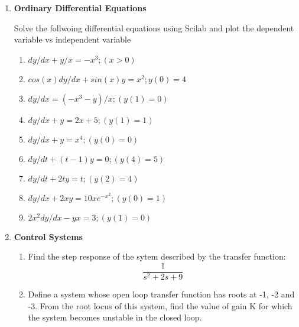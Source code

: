 \documentclass[12pt,a4paper]{article}
\newenvironment{enumcpt}{\begin{enumerate} \topsep -3mm \partopsep -3mm 
                        \parsep -3mm
                        \itemsep -0mm \leftmargin -1in \rightmargin -3mm
                        }{\end{enumerate}}
\begin{document}
\begin{multicols}{2}
\begin{enumcpt}
\begin{enumcpt}
\item Construct a polynomial with 3 repeated roots at 4 and 2 repeated
roots at 0.
Check the roots of the derivative of this polynomial. (Use derivat)

\item  Write a function that takes a polynomial and
  gives out only real roots as output.\\
  (hint isreal )

\item  Write a function that takes a polynomial and gives the
    INVERSE polynomial, i.e. all roots are inverses of each other.\\
    (Hint: Coefficients are to just be reversed.)\\
    (Check that no root was at zero: check this within the function, and
    display error, and exit.)

\item  Write a function that takes a polynomial and gives
    all the maxima/minima candidates.\\ (Hint: find all real roots of
    the derivative).

\end{enumcpt}


\item {\bf Ordinary Differential Equations}

Solve the follwoing differential equations using Scilab and plot the dependent variable vs independent variable
\begin{enumcpt}
\item  $ dy/dx + y/x = -x^3; (x>0)$
\item  $ cos(x)dy/dx + sin(x)y = x^2; y(0) = 4$
\item  $dy/dx = (-x^3-y)/x; (y(1)=0)$
\item  $dy/dx+y = 2x+5; (y(1)= 1)$
\item  $dy/dx+y = x^4; (y(0)=0)$
\item  $dy/dt + (t-1)y = 0; (y(4)=5)$
\item  $dy/dt +2ty = t; (y(2)=4)$
\item  $dy/dx+2xy=10xe^{-x^2}; (y(0)=1)$
\item  $2x^2dy/dx-yx = 3; (y(1)=0)$
\end{enumcpt}



\item {\bf Control Systems}
\begin{enumcpt}
\item Find the step response of the sytem described by the transfer function:
            \[\frac{1}{s^2 + 2s + 9}\]
        
    \item Define a system whose open loop transfer function has roots at -1, -2 and -3. From the root locus of this system, find the value of gain K for which the system becomes unstable in the closed loop.


\end{enumcpt}


\end{enumcpt}

\end{multicols}
\end{document}
